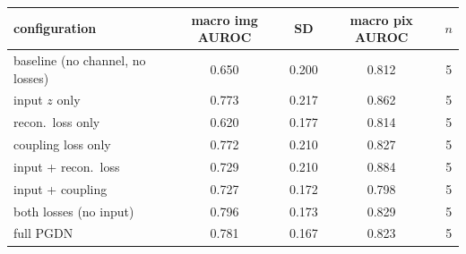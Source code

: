 \setlength{\tabcolsep}{3pt}
\begin{tabular}{@{}lcccc@{}}
\toprule
configuration & macro img AUROC & SD & macro pix AUROC & $n$ \\
\midrule
baseline (no channel, no losses) & 0.650 & 0.200 & 0.812 & 5 \\
input $z$ only & 0.773 & 0.217 & 0.862 & 5 \\
recon.~loss only & 0.620 & 0.177 & 0.814 & 5 \\
coupling loss only & 0.772 & 0.210 & 0.827 & 5 \\
input + recon.~loss & 0.729 & 0.210 & 0.884 & 5 \\
input + coupling & 0.727 & 0.172 & 0.798 & 5 \\
both losses (no input) & 0.796 & 0.173 & 0.829 & 5 \\
full PGDN & 0.781 & 0.167 & 0.823 & 5 \\
\bottomrule
\end{tabular}
